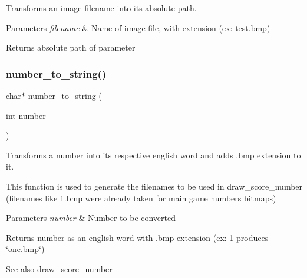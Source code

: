 Transforms an image filename into its absolute path. 


\begin{DoxyParams}{Parameters}
{\em filename} & Name of image file, with extension (ex\+: test.\+bmp) \\
\hline
\end{DoxyParams}
\begin{DoxyReturn}{Returns}
absolute path of parameter 
\end{DoxyReturn}
\hypertarget{group__utils_gac1f5ea8c8660adf99729789da39cf9ce}{}\label{group__utils_gac1f5ea8c8660adf99729789da39cf9ce} 
\subsubsection{\texorpdfstring{number\+\_\+to\+\_\+string()}{number\_to\_string()}}
{\footnotesize\ttfamily char$\ast$ number\+\_\+to\+\_\+string (\begin{DoxyParamCaption}\item[{int}]{number }\end{DoxyParamCaption})}



Transforms a number into its respective english word and adds .bmp extension to it. 

This function is used to generate the filenames to be used in draw\+\_\+score\+\_\+number (filenames like 1.\+bmp were already taken for main game numbers\textquotesingle{} bitmaps)


\begin{DoxyParams}{Parameters}
{\em number} & Number to be converted \\
\hline
\end{DoxyParams}
\begin{DoxyReturn}{Returns}
number as an english word with .bmp extension (ex\+: 1 produces \char`\"{}one.\+bmp\char`\"{}) 
\end{DoxyReturn}
\begin{DoxySeeAlso}{See also}
\hyperlink{group__utils_ga6c6627d0ed2f743fc34057524d37296f}{draw\+\_\+score\+\_\+number} 
\end{DoxySeeAlso}
\hypertarget{group__utils_ga3bebfa53ca8923b1d684663aa409b286}{}\label{group__utils_ga3bebfa53ca8923b1d684663aa409b286} 
